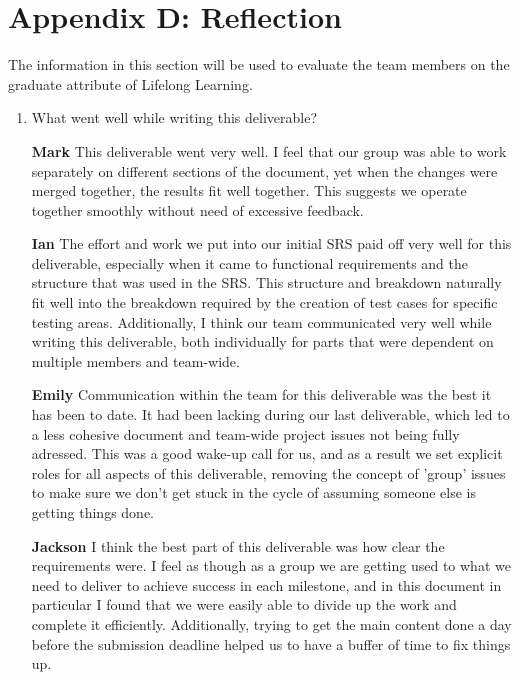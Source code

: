 \documentclass[12pt, titlepage]{article}
\begin{document}
\section*{Appendix D: Reflection}

The information in this section will be used to evaluate the team members on the
graduate attribute of Lifelong Learning.



\begin{enumerate}[leftmargin=*]
  \item What went well while writing this deliverable?
  
  \textbf{Mark} This deliverable went very well. I feel that our group was able to work separately on 
  different sections of the document, yet when the changes were merged together, the results fit well 
  together. This suggests we operate together smoothly without need of excessive feedback.

  \textbf{Ian} The effort and work we put into our initial SRS paid off very well for this deliverable, 
  especially when it came to functional requirements and the structure that was used in the SRS. This 
  structure and breakdown naturally fit well into the breakdown required by the creation of test cases 
  for specific testing areas. Additionally, I think our team communicated very well while writing this 
  deliverable, both individually for parts that were dependent on multiple members and team-wide. 

  \textbf{Emily} Communication within the team for this deliverable was the best it has been to date. 
  It had been lacking during our last deliverable, which led to a less cohesive document and team-wide
  project issues not being fully adressed. This was a good wake-up call for us, and as a result we set
  explicit roles for all aspects of this deliverable, removing the concept of 'group' issues to make 
  sure we don't get stuck in the cycle of assuming someone else is getting things done.

  \textbf{Jackson} I think the best part of this deliverable was how clear the requirements were. I feel as 
  though as a group we are getting used to what we need to deliver to achieve success in each milestone, and in 
  this document in particular I found that we were easily able to divide up the work and complete it efficiently. 
  Additionally, trying to get the main content done a day before the submission deadline helped us to have a buffer 
  of time to fix things up.
  

\end{enumerate}
\end{document}

